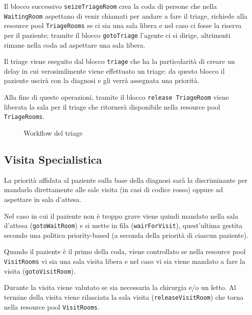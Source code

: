 Il blocco successivo \texttt{seizeTriageRoom} crea la coda di persone che nella \texttt{WaitingRoom} aspettano di venir chiamati per andare a fare il triage, richiede alla resource pool \texttt{TriageRooms} se ci sia una sala libera e nel caso ci fosse la riserva per il paziente; tramite il blocco \texttt{gotoTriage} l’agente ci si dirige, altrimenti rimane nella coda ad aspettare una sala libera.

Il triage viene eseguito dal blocco \texttt{triage} che ha la particolarità di creare un delay in cui verosimilmente viene effettuato un triage: da questo blocco il paziente uscirà con la diagnosi e gli verrà assegnata una priorità.

Alla fine di queste operazioni, tramite il blocco \texttt{release TriageRoom} 
viene liberata la sala per il triage 
che ritornerà disponibile nella resource pool \texttt{TriageRooms}.\\


\begin{figure}[!htb]
    \centering
    \caption{Workflow del triage}
\end{figure}

\clearpage

\subsection{Visita Specialistica}
La priorità affidata al paziente sulla base della diagnosi sarà la discriminante per mandarlo direttamente alle sale visita (in casi di codice rosso) oppure ad aspettare in sala d’attesa.

Nel caso in cui il paziente non è troppo grave viene quindi mandato nella sala d’attesa (\texttt{gotoWaitRoom}) e si mette in fila (\texttt{wairForVisit}), quest'ultima gestita secondo una politica priority-based (a seconda della priorità di ciascun paziente).

Quando il paziente è il primo della coda, viene controllato se nella resource pool \texttt{VisitRooms} vi sia una sala visita libera e nel caso vi sia viene mandato a fare la visita (\texttt{gotoVisitRoom}).
 
Durante la visita viene valutato se sia necessaria la chirurgia e/o un letto. Al termine della visita viene 
rilasciata la sala visita (\texttt{releaseVisitRoom}) che torna nella resource pool \texttt{VisitRooms}. \\


